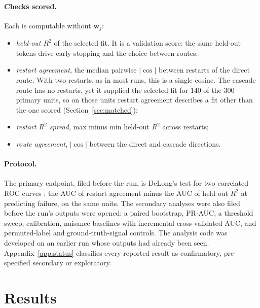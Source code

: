 \documentclass[10pt]{article}
\begin{document}
\paragraph{Checks scored.} Each is computable without $\mathbf{w}_j$:
\begin{itemize}
  \item \emph{held-out $R^2$} of the selected fit. It is a validation score: the same held-out
  tokens drive early stopping and the choice between routes;
  \item \emph{restart agreement}, the median pairwise $|\cos|$ between restarts of the direct
  route. With two restarts, as in most runs, this is a single cosine. The cascade route has no
  restarts, yet it supplied the selected fit for 140 of the 300 primary units, so on those units
  restart agreement describes a fit other than the one scored (Section~\ref{sec:matched});
  \item \emph{restart $R^2$ spread}, max minus min held-out $R^2$ across restarts;
  \item \emph{route agreement}, $|\cos|$ between the direct and cascade directions.
\end{itemize}

\paragraph{Protocol.} The primary endpoint, filed before the run, is DeLong's test for two
correlated ROC curves \citep{delong1988comparing}: the AUC of restart agreement minus the AUC of
held-out $R^2$ at predicting failure, on the same units. The secondary analyses were also filed
before the run's outputs were opened: a paired bootstrap, PR-AUC, a threshold sweep,
calibration, nuisance baselines with incremental cross-validated AUC, and permuted-label and
ground-truth-signal controls. The analysis code was developed on an earlier run whose outputs
had already been seen.
Appendix~\ref{app:status} classifies every reported result as confirmatory, pre-specified
secondary or exploratory.

\section{Results}
\label{sec:results}
\end{document}
